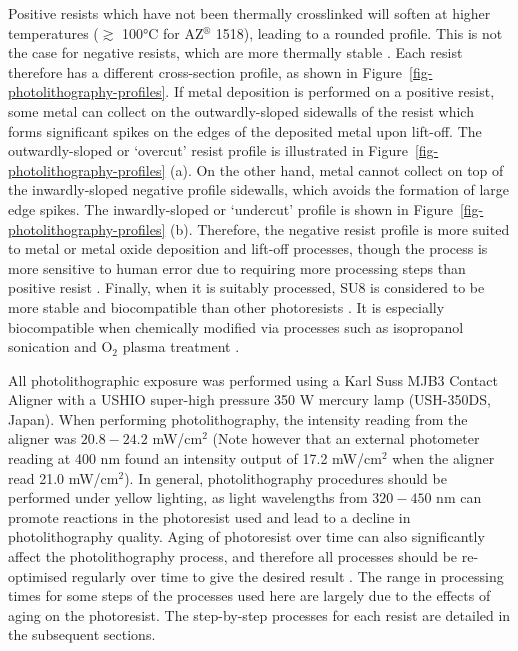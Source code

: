 \documentclass[
  a4paper,
]{scrbook}
\begin{document}
Positive resists which have not been thermally crosslinked will soften
at higher temperatures (\(\gtrsim\) 100°C for AZ\(^\circledR\) 1518),
leading to a rounded profile. This is not the case for negative resists,
which are more thermally stable \autocite{Microchemicals}. Each resist
therefore has a different cross-section profile, as shown in
Figure~\ref{fig-photolithography-profiles}. If metal deposition is
performed on a positive resist, some metal can collect on the
outwardly-sloped sidewalls of the resist which forms significant spikes
on the edges of the deposited metal upon lift-off. The outwardly-sloped
or `overcut' resist profile is illustrated in
Figure~\ref{fig-photolithography-profiles} (a). On the other hand, metal
cannot collect on top of the inwardly-sloped negative profile sidewalls,
which avoids the formation of large edge spikes. The inwardly-sloped or
`undercut' profile is shown in
Figure~\ref{fig-photolithography-profiles} (b). Therefore, the negative
resist profile is more suited to metal or metal oxide deposition and
lift-off processes, though the process is more sensitive to human error
due to requiring more processing steps than positive resist
\autocite{Microchemicals}. Finally, when it is suitably processed, SU8
is considered to be more stable and biocompatible than other
photoresists \autocite{Albarghouthi2022}. It is especially biocompatible
when chemically modified via processes such as isopropanol sonication
and O\(_2\) plasma treatment \autocite{Chen2021}.

All photolithographic exposure was performed using a Karl Suss MJB3
Contact Aligner with a USHIO super-high pressure 350 W mercury lamp
(USH-350DS, Japan). When performing photolithography, the intensity
reading from the aligner was \(20.8-24.2\) mW/cm\(^2\) (Note however
that an external photometer reading at 400 nm found an intensity output
of 17.2 mW/cm\(^2\) when the aligner read 21.0 mW/cm\(^2\)). In general,
photolithography procedures should be performed under yellow lighting,
as light wavelengths from \(320-450\) nm can promote reactions in the
photoresist used and lead to a decline in photolithography quality.
Aging of photoresist over time can also significantly affect the
photolithography process, and therefore all processes should be
re-optimised regularly over time to give the desired result
\autocite{Microchemicals}. The range in processing times for some steps
of the processes used here are largely due to the effects of aging on
the photoresist. The step-by-step processes for each resist are detailed
in the subsequent sections.
\end{document}
